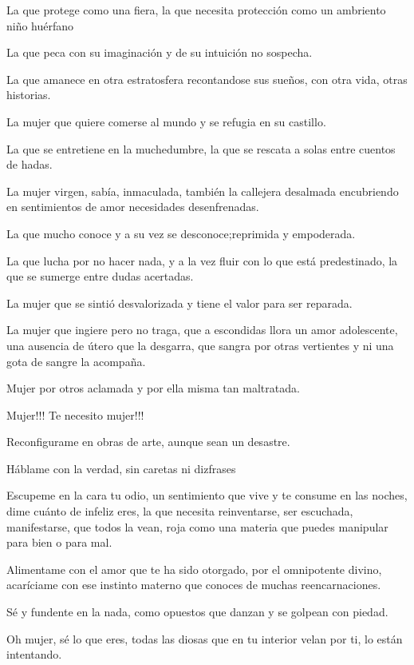 \documentclass[12pt, a4paper, twoside]{book} %
\begin{document}
La que protege como una fiera, la que necesita protección como un ambriento niño huérfano

La que peca con su imaginación y de su intuición no sospecha.

La que amanece en otra estratosfera recontandose sus sueños, con otra vida, otras historias.

La mujer que quiere comerse al mundo y se refugia en su castillo.

La que se entretiene en la muchedumbre, la que se rescata a solas entre cuentos de hadas.

La mujer virgen, sabía, inmaculada, también la callejera desalmada encubriendo en sentimientos de amor necesidades desenfrenadas.

La que mucho conoce y a su vez se desconoce;reprimida y empoderada.

La que lucha por no hacer nada, y a la vez fluir con lo que está predestinado, la que se sumerge entre dudas acertadas.

La mujer que se sintió desvalorizada y tiene el valor para ser reparada.

La mujer que ingiere pero no traga, que a escondidas llora un amor adolescente, una ausencia de útero que la desgarra, que sangra por otras vertientes y ni una gota de sangre la acompaña.

Mujer por otros aclamada y por ella misma tan maltratada.

Mujer!!! Te necesito mujer!!!

Reconfigurame en obras de arte, aunque sean un desastre.

Háblame con la verdad, sin caretas ni dizfrases

Escupeme en la cara tu odio, un sentimiento que vive y te consume en las noches, dime cuánto de infeliz eres, la que necesita reinventarse, ser escuchada, manifestarse, que todos la vean, roja como una materia que puedes manipular para bien o para mal.

Alimentame con el amor que te ha sido otorgado, por el omnipotente divino, acaríciame con ese instinto materno que conoces de muchas reencarnaciones.

Sé y fundente en la nada, como opuestos que danzan y se golpean con piedad.

Oh mujer, sé lo que eres, todas las diosas que en tu interior velan por ti, lo están intentando.
\end{document}
